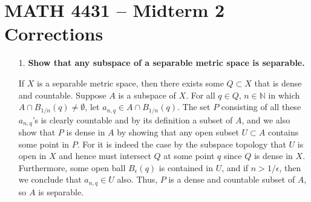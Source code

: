 \documentclass[a4paper,12pt]{article}
\begin{document}
\section*{MATH 4431 -- Midterm 2 Corrections}
\begin{enumerate}
    \item[1.]
        \boldmath\textbf{Show that any subspace of a separable metric space is separable.
        }\unboldmath \par
        If $X$ is a separable metric space, then there exists some $Q \subset X$ that is dense and countable. Suppose $A$ is a subspace of $X$. For all $q \in Q$, $n \in \mathbb{N}$ in which $A \cap B_{1/n}(q) \neq \emptyset$, let $a_{n, q} \in A \cap B_{1/n}(q)$. The set $P$ consisting of all these $a_{n, q}$'s is clearly countable and by its definition a subset of $A$, and we also show that $P$ is dense in $A$ by showing that any open subset $U \subset A$ contains some point in $P$. For it is indeed the case by the subspace topology that $U$ is open in $X$ and hence must intersect $Q$ at some point $q$ since $Q$ is dense in $X$. Furthermore, some open ball $B_\epsilon(q)$ is contained in $U$, and if $n > 1/\epsilon$, then we conclude that $a_{n, q} \in U$ also. Thus, $P$ is a dense and countable subset of $A$, so $A$ is separable.


\end{enumerate}
\end{document}
